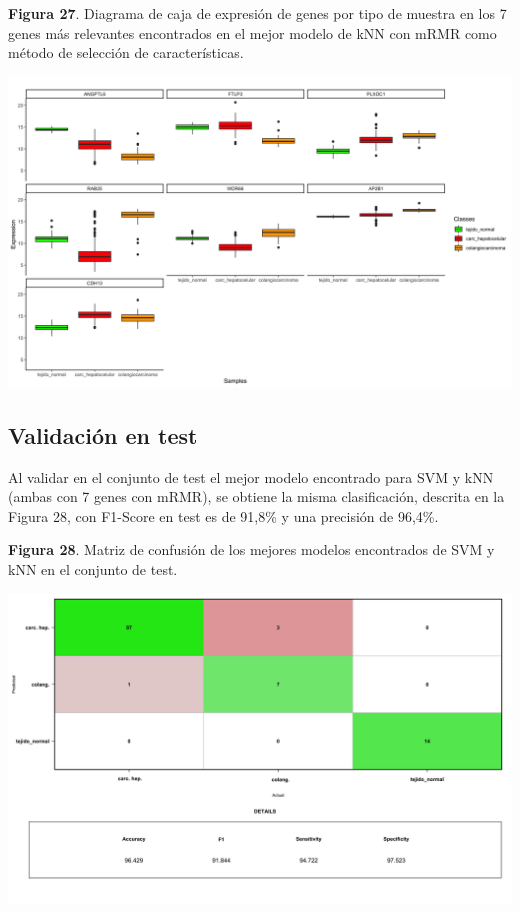 \newpage
\begin{center}
\textbf{Figura 27}. Diagrama de caja de expresión de genes por tipo de muestra en los 7 genes más relevantes encontrados en el mejor modelo de kNN con mRMR como método de selección de características.
\end{center}
\begin{center}
	\includegraphics[width=1\textwidth]{figuras/27_higado_multiclase_34_knn_boxplots_mejor_metodo.png} 
\end{center}

\newpage

\subsection{Validación en test}



Al validar en el conjunto de test el mejor modelo encontrado para SVM y kNN (ambas con 7 genes con mRMR),  se obtiene la misma clasificación, descrita en la Figura 28, con F1-Score en test es de 91,8\% y una precisión de 96,4\%.\\

\begin{center}
\textbf{Figura 28}. Matriz de confusión de los mejores modelos encontrados de SVM y kNN en el conjunto de test.
\end{center}

\begin{center}
	\includegraphics[width=1\textwidth]{figuras/28_higado_multiclase_15_svm_matriz_confusion_mejor_metodo_mejorado.png} 
\end{center}

